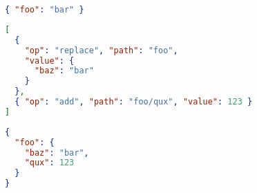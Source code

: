 \label{appendix:JSONpatch}

\begin{lstlisting}[language=json,caption=Initial JSON document]
{ "foo": "bar" }
\end{lstlisting}

\begin{lstlisting}[language=json,caption=JSON patch]
[
  { 
    "op": "replace", "path": "foo",
    "value": {
      "baz": "bar"
    }
  },
  { "op": "add", "path": "foo/qux", "value": 123 }
]
\end{lstlisting}

\begin{lstlisting}[language=json,caption=Resulting JSON document]
{
  "foo": {
    "baz": "bar",
    "qux": 123
  }
}
\end{lstlisting}
